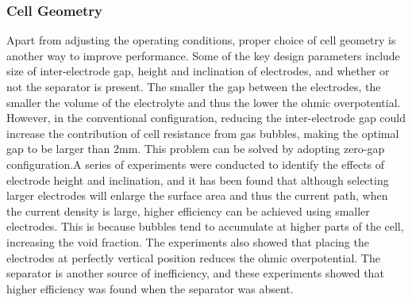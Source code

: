 \subsubsection{Cell Geometry} 
Apart from adjusting the operating conditions, proper choice of cell geometry is another way to improve performance. Some of the key design parameters include size of inter-electrode gap, height and inclination of electrodes, and whether or not the separator is present. The smaller the gap between the electrodes, the smaller the volume of the electrolyte and thus the lower the ohmic overpotential. However, in the conventional configuration, reducing the inter-electrode gap could increase the contribution of cell resistance from gas bubbles, making the optimal gap to be larger than 2mm. This problem can be solved by adopting zero-gap configuration.\cite{zerogap}A series of experiments\cite{geometry} were conducted to identify the effects of electrode height and inclination, and it has been found that although selecting larger electrodes will enlarge the surface area and thus the current path, when the current density is large, higher efficiency can be achieved using smaller electrodes. This is 
because bubbles tend to accumulate at higher parts of the cell, increasing the void fraction. The experiments also showed that placing the electrodes at perfectly vertical position reduces the ohmic overpotential. The separator is another source of inefficiency, and these experiments showed that higher efficiency was found when the separator was absent. 

